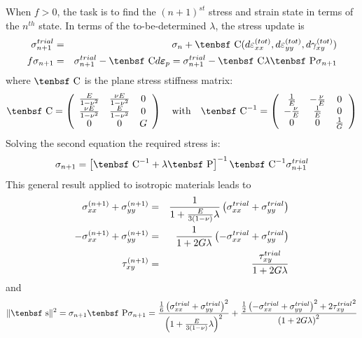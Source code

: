 \documentclass[11pt]{book}
\renewcommand{\vec}[1]{\boldsymbol{#1}}
\def\C{\hbox{\tenbsf C}}
\def\dev{\hbox{\tenbsf s}}
\def\dpl{d \vec{\varepsilon}_{p}}
\def\f{\hbox{\tenbsf f}}
\def\P{\hbox{\tenbsf P}}
\def\s#1{\sigma_{#1}}
\begin{document}
When $f>0$, the task is to find the $(n+1)^{st}$ stress and strain state in terms of the $n^{th}$ state. In terms of the to-be-determined $\lambda$, the stress update is
\begin{eqnarray}
        \s{n+1}^{trial} & = & \sigma_n + \C (d\varepsilon_{xx}^{(tot)},  d\varepsilon_{yy}^{(tot)}, d\gamma_{xy}^{(tot)})  \\f
        \s{n+1} & = & \s{n+1}^{trial} - \C \dpl = \s{n+1}^{trial} - \C \lambda \P\s{n+1}
\end{eqnarray}
where $\C$ is the plane stress stiffness matrix:
\begin{equation}
          \C =  \left( \begin{array}{ccc}
                    {E\over 1-\nu^2} & {\nu E\over 1-\nu^2} & 0 \\ 
                    {\nu E\over 1-\nu^2} & {E\over 1-\nu^2} & 0 \\ 
                    0 & 0 & G \end{array}\right)
                   \quad {\rm with} \quad
          \C^{-1} =   \left( \begin{array}{ccc}
                    {1\over E} & -{\nu \over E} & 0 \\ 
                    -{\nu \over E} & {1\over E} & 0 \\ 
                    0 & 0 & {1\over G} \end{array}\right)
\end{equation}
Solving the second equation the required stress is:
\begin{equation}
       \s{n+1} = \left[\C^{-1} + \lambda\P\right]^{-1} \C^{-1}  \s{n+1}^{trial}
\end{equation}
This general result applied to isotropic materials leads to
\begin{eqnarray}
     \s{xx}^{(n+1)} + \s{yy}^{(n+1)} & = & {1\over 1 + { E\over 3(1-\nu)}\lambda} \left( \s{xx}^{trial} +  \s{yy}^{trial} \right) \\
     -\s{xx}^{(n+1)} + \s{yy}^{(n+1)} & = & {1\over 1 + 2 G\lambda} \left( -\s{xx}^{trial} +  \s{yy}^{trial} \right) \\
     \tau_{xy}^{(n+1)} & = & {\tau_{xy}^{trial}\over 1 + 2 G\lambda} 
\end{eqnarray}
and
\begin{equation}
    \|\dev\|^2 = \s{n+1}\P\s{n+1} = {{1\over 6}\left( \s{xx}^{trial} +  \s{yy}^{trial} \right)^2 \over \left( 1 + { E\over 3(1-\nu)}\lambda\right)^2}
             + {{1\over 2}\left( -\s{xx}^{trial} +  \s{yy}^{trial} \right)^2 + 2{\tau_{xy}^{trial}}^2 \over \left(1 + 2 G\lambda\right)^2}
\end{equation}
\end{document}
